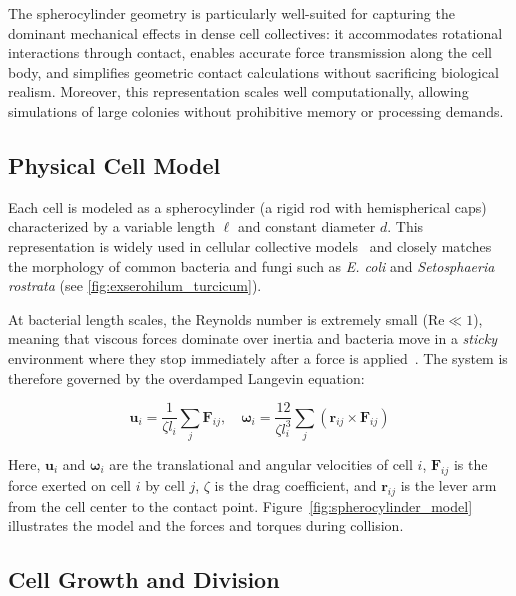\documentclass[conference]{IEEEtran}
\begin{document}
The spherocylinder geometry is particularly well-suited for capturing the dominant mechanical effects in dense cell collectives: it accommodates rotational interactions through contact, enables accurate force transmission along the cell body, and simplifies geometric contact calculations without sacrificing biological realism. Moreover, this representation scales well computationally, allowing simulations of large colonies without prohibitive memory or processing demands.

\subsection{Physical Cell Model}

Each cell is modeled as a spherocylinder (a rigid rod with hemispherical caps) characterized by a variable length $\ell$ and constant diameter $d$. This representation is widely used in cellular collective models~\cite{You2018, Weady2024, Blanchard2015, Warren2019, Ghosh2015} and closely matches the morphology of common bacteria and fungi such as \textit{E. coli} and \textit{Setosphaeria rostrata} (see \autoref{fig:exserohilum_turcicum}).

At bacterial length scales, the Reynolds number is extremely small ($\text{Re} \ll 1$), meaning that viscous forces dominate over inertia and bacteria move in a \textit{sticky} environment where they stop immediately after a force is applied~\cite{datta2024lifelowreynoldsnumber,Rudge2012}. The system is therefore governed by the overdamped Langevin equation:

\begin{equation} \label{eq:overdamped_langevin}
    \mathbf{u}_i = \frac{1}{\zeta l_i} \sum_j \mathbf{F}_{ij}, \quad
    \boldsymbol{\omega}_i = \frac{12}{\zeta l_i^3} \sum_j (\mathbf{r}_{ij} \times \mathbf{F}_{ij})
\end{equation}

Here, $\mathbf{u}_i$ and $\boldsymbol{\omega}_i$ are the translational and angular velocities of cell $i$, $\mathbf{F}_{ij}$ is the force exerted on cell $i$ by cell $j$, $\zeta$ is the drag coefficient, and $\mathbf{r}_{ij}$ is the lever arm from the cell center to the contact point. Figure~\ref{fig:spherocylinder_model} illustrates the model and the forces and torques during collision.

\subsection{Cell Growth and Division}
\end{document}
